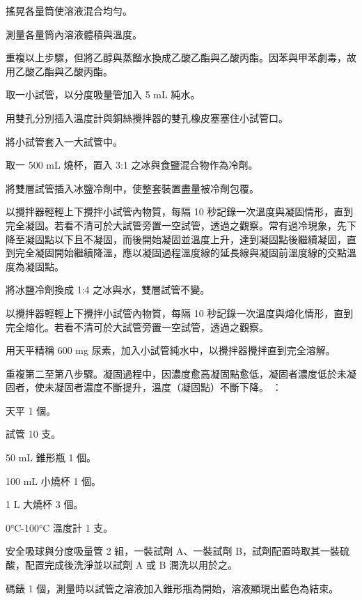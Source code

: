\documentclass[a4paper,12pt]{article}
\begin{document}
\item 搖晃各量筒使溶液混合均勻。
\item 測量各量筒內溶液體積與溫度。
\item 重複以上步驟，但將乙醇與蒸餾水換成乙酸乙酯與乙酸丙酯。因苯與甲苯劇毒，故用乙酸乙酯與乙酸丙酯。
\een
{}
\ben
\item 取一小試管，以分度吸量管加入 5 mL 純水。
\item 用雙孔分別插入溫度計與銅絲攪拌器的雙孔橡皮塞塞住小試管口。
\item 將小試管套入一大試管中。
\item 取一 500 mL 燒杯，置入 3:1 之冰與食鹽混合物作為冷劑。
\item 將雙層試管插入冰鹽冷劑中，使整套裝置盡量被冷劑包覆。
\item 以攪拌器輕輕上下攪拌小試管內物質，每隔 10 秒記錄一次溫度與凝固情形，直到完全凝固。若看不清可於大試管旁置一空試管，透過之觀察。常有過冷現象，先下降至凝固點以下且不凝固，而後開始凝固並溫度上升，達到凝固點後繼續凝固，直到完全凝固開始繼續降溫，應以凝固過程溫度線的延長線與凝固前溫度線的交點溫度為凝固點。
\item 將冰鹽冷劑換成 1:4 之冰與水，雙層試管不變。
\item 以攪拌器輕輕上下攪拌小試管內物質，每隔 10 秒記錄一次溫度與熔化情形，直到完全熔化。若看不清可於大試管旁置一空試管，透過之觀察。
\item 用天平精稱 600 mg 尿素，加入小試管純水中，以攪拌器攪拌直到完全溶解。
\item 重複第二至第八步驟。凝固過程中，因濃度愈高凝固點愈低，凝固者濃度低於未凝固者，使未凝固者濃度不斷提升，溫度（凝固點）不斷下降。
\een
{}
：
\bit
\item 天平 1 個。
\item 試管 10 支。
\item 50 mL 錐形瓶 1 個。
\item 100 mL 小燒杯 1 個。
\item 1 L 大燒杯 3 個。
\item 0°C-100°C 溫度計 1 支。
\item 安全吸球與分度吸量管 2 組，一裝試劑 A、一裝試劑 B，試劑配置時取其一裝硫酸，配置完成後洗淨並以試劑 A 或 B 潤洗以用於之。
\item 碼錶 1 個，測量時以試管之溶液加入錐形瓶為開始，溶液顯現出藍色為結束。
\eit
\end{document}

